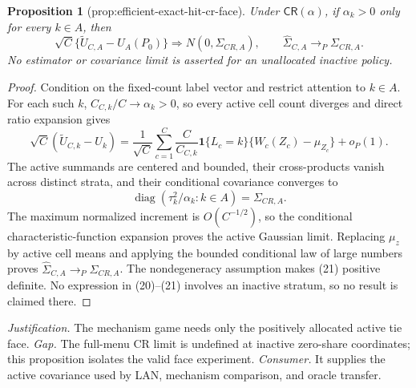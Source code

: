 \documentclass{article}
\newtheorem{proposition}{Proposition}
\begin{document}
\begin{proposition}[prop:efficient-exact-hit-cr-face]\label{prop:efficient-exact-hit-cr-face}
Under \(\mathsf{CR}(\alpha)\), if \(\alpha_k>0\) only for every \(k\in A\), then \[\sqrt C\{\widetilde U_{C,A}-U_A(P_0)\}\Rightarrow N(0,\Sigma_{CR,A}),\qquad \widehat\Sigma_{C,A}\to_P\Sigma_{CR,A}.\] No estimator or covariance limit is asserted for an unallocated inactive policy.
\end{proposition}
\begin{proof}
Condition on the fixed-count label vector and restrict attention to \(k\in A\).  For each such \(k\), \(C_{C,k}/C\to\alpha_k>0\), so every active cell count diverges and direct ratio expansion gives
\[
 \sqrt C(\widetilde U_{C,k}-U_k)
 =\frac1{\sqrt C}\sum_{c=1}^C\frac{C}{C_{C,k}}\mathbf1\{L_c=k\}
 \{W_c(Z_c)-\mu_{Z_c}\}+o_P(1). \tag{20}
\]
The active summands are centered and bounded, their cross-products vanish across distinct strata, and their conditional covariance converges to
\[
 \operatorname{diag}(\tau_k^2/\alpha_k:k\in A)=\Sigma_{CR,A}. \tag{21}
\]
The maximum normalized increment is \(O(C^{-1/2})\), so the conditional characteristic-function expansion proves the active Gaussian limit.  Replacing \(\mu_z\) by active cell means and applying the bounded conditional law of large numbers proves \(\widehat\Sigma_{C,A}\to_P\Sigma_{CR,A}\).  The nondegeneracy assumption makes (21) positive definite.  No expression in (20)--(21) involves an inactive stratum, so no result is claimed there.
\end{proof}
\par\smallskip\noindent \textit{Justification.} The mechanism game needs only the positively allocated active tie face. \textit{Gap.} The full-menu CR limit is undefined at inactive zero-share coordinates; this proposition isolates the valid face experiment. \textit{Consumer.} It supplies the active covariance used by LAN, mechanism comparison, and oracle transfer.
\end{document}
